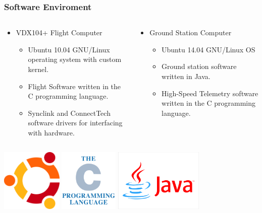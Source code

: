 \documentclass[landscape,xcolor={table},10pt]{beamer}
\begin{document}
	\begin{frame}
		\frametitle{Software Enviroment}
		
				\begin{columns}[T] %
				\begin{column}{.49\textwidth}
					\begin{itemize}
						\item VDX104+ Flight Computer
						\begin{itemize}
							\item Ubuntu 10.04 GNU/Linux operating system with custom kernel.
							\item Flight Software written in the C programming language.
							\item Synclink and ConnectTech software drivers for interfacing with hardware.
						\end{itemize}
					\end{itemize}
				
				\end{column}%
				\hfill%
				\begin{column}{.49\textwidth}
					\begin{itemize}
						\item Ground Station Computer
						\begin{itemize}
							\item Ubuntu 14.04 GNU/Linux OS
							\item Ground station software written in Java.
							\item High-Speed Telemetry software written in the C programming language.
						\end{itemize}
					\end{itemize}
							
				\end{column}%
				\end{columns}
				\begin{center}
					\includegraphics[height=3cm]{ubuntu-logo}
					\includegraphics[height=3cm]{c}
					\includegraphics[height=3cm]{java}
				\end{center}

		
	\end{frame}
	
\end{document}
